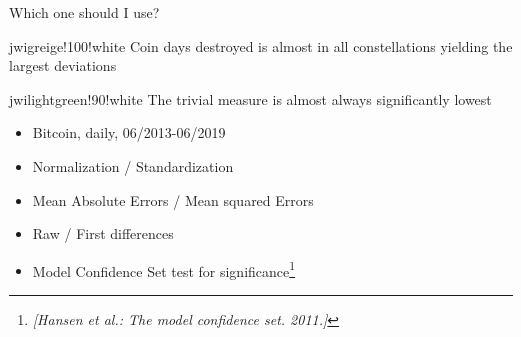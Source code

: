\begin{frame}{Which one should I use?}	
	\begin{alertblockc}{}{jwigreige!100!white}%
		Coin days destroyed is almost in all constellations yielding the largest deviations
	\end{alertblockc}
	\begin{alertblockc}{}{jwilightgreen!90!white}%
		The trivial measure is almost always significantly lowest
	\end{alertblockc}
	
	\textbf{}
	\begin{itemize}  
		\item Bitcoin, daily, 06/2013-06/2019
		\item Normalization / Standardization
		\item Mean Absolute Errors / Mean squared Errors
		\item Raw / First differences
		\item Model Confidence Set test for significance\footnote{\emph{\scriptsize[Hansen et al.: {T}he model confidence set. 2011.]}}
	\end{itemize}
\end{frame}

%

